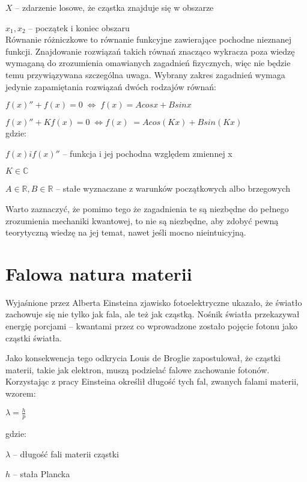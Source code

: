 \documentclass{SGGW-thesis}
\begin{document}
	$X$ -- zdarzenie losowe, że cząstka znajduje się w obszarze
	
	$x_1, x_2$ -- początek i koniec obszaru\\ 	
	
	Równanie różniczkowe to równanie funkcyjne zawierające pochodne nieznanej funkcji. Znajdowanie rozwiązań takich równań znacząco wykracza poza wiedzę wymaganą do zrozumienia omawianych zagadnień fizycznych, więc nie będzie temu przywiązywana szczególna uwaga. Wybrany zakres zagadnień wymaga jedynie zapamiętania rozwiązań dwóch rodzajów równań:
	
	$f(x)''+f(x)=0 \;\Longleftrightarrow\; f(x) = Acosx + Bsinx$
	
	$f(x)''+Kf(x)=0 \;\Longleftrightarrow f(x)\; = Acos(Kx) + Bsin(Kx)$ \\

	gdzie:
	
	$f(x) i f(x)''$ -- funkcja i jej pochodna względem zmiennej x

	$K \in \mathbb{C}$
		
	$A \in \mathbb{R}, B \in \mathbb{R}$ -- stałe wyznaczane z warunków początkowych albo brzegowych
	
	

	Warto zaznaczyć, że pomimo tego że zagadnienia te są niezbędne do pełnego zrozumienia mechaniki kwantowej, to nie są niezbędne, aby zdobyć pewną teorytyczną wiedzę na jej temat, nawet jeśli mocno nieintuicyjną.
	\section{Falowa natura materii}
	Wyjaśnione przez Alberta Einsteina zjawisko fotoelektryczne ukazało, że światło zachowuje się nie tylko jak fala, ale też jak cząstką. Nośnik światła przekazywał energię porcjami -- kwantami przez co wprowadzone zostało pojęcie fotonu jako cząstki światła.
	
	 Jako konsekwencja tego odkrycia Louis de Broglie zapostulował, że cząstki materii, takie jak elektron, muszą podzielać falowe zachowanie fotonów. Korzystając z pracy Einsteina określił długość tych fal, zwanych falami materii, wzorem:
	 
	 \begin{center}
	 $\lambda=\frac{h}{p}$
	 \end{center}
	 
	 gdzie:
	 
	 $\lambda$ -- długość fali materii cząstki
	 
	 $h$ -- stała Plancka
	 
\end{document}

